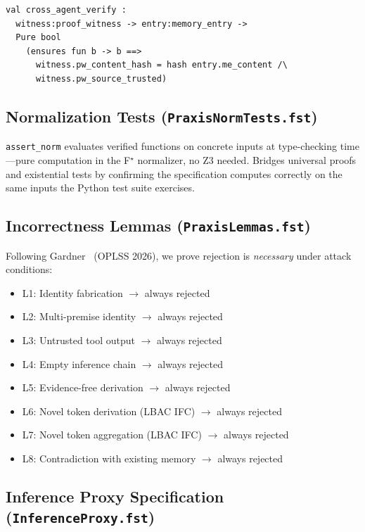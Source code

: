 \documentclass[sigplan,screen,nonacm]{acmart}
\newcommand{\fstar}{F\ensuremath{^\star}}
\begin{document}
\begin{lstlisting}[language=fstar,caption={Cross-agent verification: Agent B verifies Agent A's proof witness.},label={lst:witness}]
val cross_agent_verify :
  witness:proof_witness -> entry:memory_entry ->
  Pure bool
    (ensures fun b -> b ==>
      witness.pw_content_hash = hash entry.me_content /\
      witness.pw_source_trusted)
\end{lstlisting}

\subsection{Normalization Tests (\texttt{PraxisNormTests.fst})}

\texttt{assert\_norm} evaluates verified functions on concrete inputs at
type-checking time---pure computation in the \fstar{} normalizer, no Z3
needed. Bridges universal proofs and existential tests by confirming the
specification computes correctly on the same inputs the Python test suite
exercises.

\subsection{Incorrectness Lemmas (\texttt{PraxisLemmas.fst})}

Following Gardner~\cite{gardner2026incorrectness} (OPLSS 2026), we prove
rejection is \emph{necessary} under attack conditions:

\begin{itemize}
  \item L1: Identity fabrication $\to$ always rejected
  \item L2: Multi-premise identity $\to$ always rejected
  \item L3: Untrusted tool output $\to$ always rejected
  \item L4: Empty inference chain $\to$ always rejected
  \item L5: Evidence-free derivation $\to$ always rejected
  \item L6: Novel token derivation (LBAC IFC) $\to$ always rejected
  \item L7: Novel token aggregation (LBAC IFC) $\to$ always rejected
  \item L8: Contradiction with existing memory $\to$ always rejected
\end{itemize}


\subsection{Inference Proxy Specification (\texttt{InferenceProxy.fst})}
\label{sec:proxy-spec}
\end{document}
